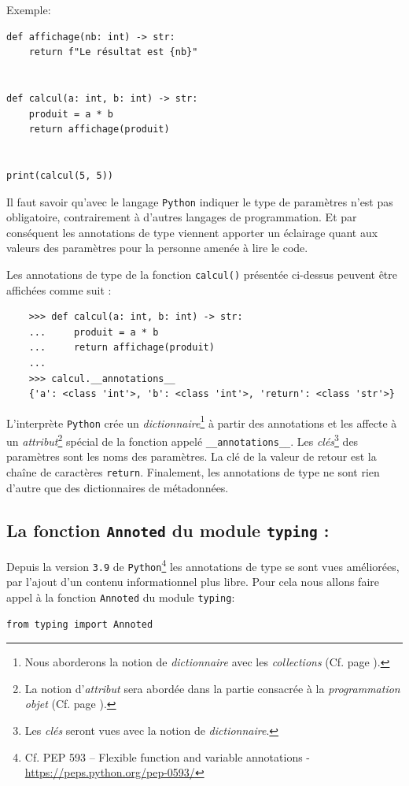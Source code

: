 \documentclass[a4paper,11pt]{book}
\begin{document}
Exemple: 
\begin{lstlisting}[caption=Les annotations de type]
def affichage(nb: int) -> str:
    return f"Le résultat est {nb}"


def calcul(a: int, b: int) -> str:
    produit = a * b
    return affichage(produit)


print(calcul(5, 5))
\end{lstlisting}
\medskip

Il faut savoir qu'avec le langage \texttt{Python} indiquer le type de paramètres n'est pas obligatoire, contrairement à d'autres langages de programmation. Et par conséquent les annotations de type viennent apporter un éclairage quant aux valeurs des paramètres pour la personne amenée à lire le code.
\medskip

Les annotations de type de la fonction \texttt{calcul()} présentée ci-dessus peuvent être affichées comme suit :
\begin{verbatim}
    >>> def calcul(a: int, b: int) -> str:
    ...     produit = a * b
    ...     return affichage(produit)
    ... 
    >>> calcul.__annotations__
    {'a': <class 'int'>, 'b': <class 'int'>, 'return': <class 'str'>}
\end{verbatim}
\medskip

L'interprète \texttt{Python} crée un \textit{dictionnaire}\footnote{Nous aborderons la notion de \textit{dictionnaire} avec les \textit{collections} (Cf. page \pageref{les_dictionnaires}).} à partir des annotations et les affecte à un \textit{attribut}\footnote{La notion d'\textit{attribut} sera abordée dans la partie consacrée à la \textit{programmation objet} (Cf. page \pageref{POO}).} spécial de la fonction appelé \texttt{\_\_annotations\_\_}. Les \textit{clés}\footnote{Les \textit{clés} seront vues avec la notion de \textit{dictionnaire}.} des paramètres sont les noms des paramètres. La clé de la valeur de retour est la chaîne de caractères \texttt{return}. Finalement, les annotations de type ne sont rien d'autre que des dictionnaires de métadonnées.
\medskip

\subsection*{La fonction \texttt{Annoted} du module \texttt{typing} : }
Depuis la version \texttt{3.9} de \texttt{Python}\footnote{Cf. PEP 593 – Flexible function and variable annotations - \url{https://peps.python.org/pep-0593/}} les annotations de type se sont vues améliorées, par l'ajout d'un contenu informationnel plus libre. Pour cela nous allons faire appel à la fonction \texttt{Annoted} du module \texttt{typing}:
\begin{lstlisting}[caption=Import de la fonction \texttt{Annoted}]
from typing import Annoted
\end{lstlisting}
\medskip
\end{document}
